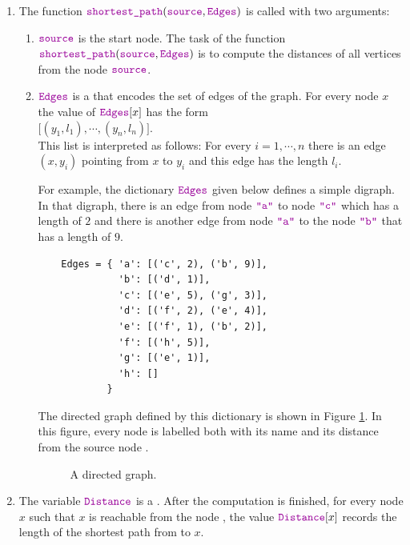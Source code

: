 \noindent
\begin{enumerate}
\item The function $\mytt{shortest\_path}(\mytt{source}, \mytt{Edges})$ is called with two arguments:
      \begin{enumerate}
      \item $\mytt{source}$ is the start node.  The task of the function
            $\mytt{shortest\_path}(\mytt{source}, \mytt{Edges})$ is to compute the distances of all 
            vertices from the node $\mytt{source}$.
      \item $\mytt{Edges}$ is a  that encodes the set of edges of the graph.  For
            every node $x$ the value of $\mytt{Edges}[x]$ has the form
            \\[0.2cm]
            \hspace*{1.3cm}
            $\bigl[ (y_1, l_1), \cdots, (y_n, l_n) \bigr]$.
            \\[0.2cm]
            This list is interpreted as follows: For every $i = 1,\cdots,n$ there is an edge
            $(x, y_i)$ pointing from $x$ to $y_i$ and this edge has the length $l_i$.

            For example, the dictionary $\mytt{Edges}$ given below defines a simple digraph.
            In that digraph, there is an edge from node $\mytt{"a"}$ to node $\mytt{"c"}$ which has a
            length of $2$ and there is another edge from node $\mytt{"a"}$ to the node $\mytt{"b"}$ that has a length of $9$.
            \begin{verbatim}
    Edges = { 'a': [('c', 2), ('b', 9)], 
              'b': [('d', 1)],
              'c': [('e', 5), ('g', 3)],  
              'd': [('f', 2), ('e', 4)],  
              'e': [('f', 1), ('b', 2)],
              'f': [('h', 5)],
              'g': [('e', 1)],
              'h': []
            }
            \end{verbatim}
      
      The directed graph defined by this dictionary is shown in Figure \ref{fig:directed-graph.pdf}.
      In this figure, every node is labelled both with its name and its distance from the source node .
      \begin{figure}[!ht]
        \centering
        \caption{A directed graph.}
        \label{fig:directed-graph.pdf}
      \end{figure}
      \end{enumerate}
\item The variable $\mytt{Distance}$ is a .  After the computation is
      finished, for every node $x$ such that $x$ is reachable from the node ,
      the value $\mytt{Distance}[x]$ records the length of the shortest path from  to $x$.


\end{enumerate}
